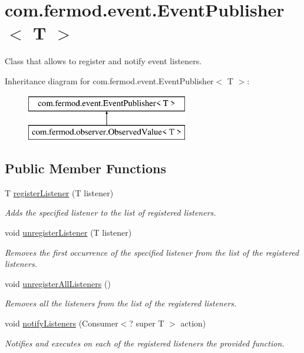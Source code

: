 \hypertarget{classcom_1_1fermod_1_1event_1_1EventPublisher}{}\section{com.\+fermod.\+event.\+Event\+Publisher$<$ T $>$}
\label{classcom_1_1fermod_1_1event_1_1EventPublisher}


Class that allows to register and notify event listeners.  


Inheritance diagram for com.\+fermod.\+event.\+Event\+Publisher$<$ T $>$\+:\begin{figure}[H]
\begin{center}
\leavevmode
\includegraphics[height=2.000000cm]{d9/d75/classcom_1_1fermod_1_1event_1_1EventPublisher}
\end{center}
\end{figure}
\subsection*{Public Member Functions}
\begin{DoxyCompactItemize}
\item 
T \mbox{\hyperlink{classcom_1_1fermod_1_1event_1_1EventPublisher_ad4ab74518bb83dede43fa2be3a38e8cd}{register\+Listener}} (T listener)
\begin{DoxyCompactList}\small\item\em Adds the specified listener to the list of registered listeners. \end{DoxyCompactList}\item 
void \mbox{\hyperlink{classcom_1_1fermod_1_1event_1_1EventPublisher_a26d9e5e851b0eae73fd9b81074dfc41f}{unregister\+Listener}} (T listener)
\begin{DoxyCompactList}\small\item\em Removes the first occurrence of the specified listener from the list of the registered listeners. \end{DoxyCompactList}\item 
void \mbox{\hyperlink{classcom_1_1fermod_1_1event_1_1EventPublisher_ac33f3e6657288e4872d3c942d6291687}{unregister\+All\+Listeners}} ()
\begin{DoxyCompactList}\small\item\em Removes all the listeners from the list of the registered listeners. \end{DoxyCompactList}\item 
void \mbox{\hyperlink{classcom_1_1fermod_1_1event_1_1EventPublisher_ad137b92c3d655d2e6cfd3349ffc41938}{notify\+Listeners}} (Consumer$<$? super T $>$ action)
\begin{DoxyCompactList}\small\item\em Notifies and executes on each of the registered listeners the provided function. \end{DoxyCompactList}\end{DoxyCompactItemize}
